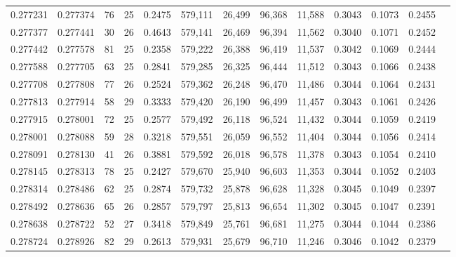 \begin{tabular}{rrrrrrrrrrrrr}
0.277231 & 0.277374 &  76 &  25 &                                     0.2475 & 579,111 &  26,499 &  96,368 &  11,588 & 0.3043 & 0.1073 & 0.2455 \\
0.277377 & 0.277441 &  30 &  26 &                                     0.4643 & 579,141 &  26,469 &  96,394 &  11,562 & 0.3040 & 0.1071 & 0.2452 \\
0.277442 & 0.277578 &  81 &  25 &                                     0.2358 & 579,222 &  26,388 &  96,419 &  11,537 & 0.3042 & 0.1069 & 0.2444 \\
0.277588 & 0.277705 &  63 &  25 &                                     0.2841 & 579,285 &  26,325 &  96,444 &  11,512 & 0.3043 & 0.1066 & 0.2438 \\
0.277708 & 0.277808 &  77 &  26 &                                     0.2524 & 579,362 &  26,248 &  96,470 &  11,486 & 0.3044 & 0.1064 & 0.2431 \\
0.277813 & 0.277914 &  58 &  29 &                                     0.3333 & 579,420 &  26,190 &  96,499 &  11,457 & 0.3043 & 0.1061 & 0.2426 \\
0.277915 & 0.278001 &  72 &  25 &                                     0.2577 & 579,492 &  26,118 &  96,524 &  11,432 & 0.3044 & 0.1059 & 0.2419 \\
0.278001 & 0.278088 &  59 &  28 &                                     0.3218 & 579,551 &  26,059 &  96,552 &  11,404 & 0.3044 & 0.1056 & 0.2414 \\
0.278091 & 0.278130 &  41 &  26 &                                     0.3881 & 579,592 &  26,018 &  96,578 &  11,378 & 0.3043 & 0.1054 & 0.2410 \\
0.278145 & 0.278313 &  78 &  25 &                                     0.2427 & 579,670 &  25,940 &  96,603 &  11,353 & 0.3044 & 0.1052 & 0.2403 \\
0.278314 & 0.278486 &  62 &  25 &                                     0.2874 & 579,732 &  25,878 &  96,628 &  11,328 & 0.3045 & 0.1049 & 0.2397 \\
0.278492 & 0.278636 &  65 &  26 &                                     0.2857 & 579,797 &  25,813 &  96,654 &  11,302 & 0.3045 & 0.1047 & 0.2391 \\
0.278638 & 0.278722 &  52 &  27 &                                     0.3418 & 579,849 &  25,761 &  96,681 &  11,275 & 0.3044 & 0.1044 & 0.2386 \\
0.278724 & 0.278926 &  82 &  29 &                                     0.2613 & 579,931 &  25,679 &  96,710 &  11,246 & 0.3046 & 0.1042 & 0.2379 \\

\end{tabular}
